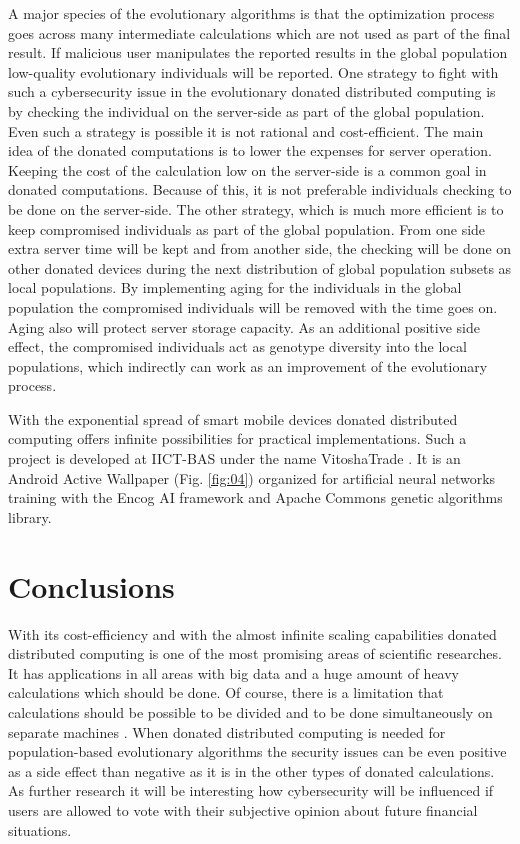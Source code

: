 \documentclass[graybox]{svmult}
\begin{document}
A major species of the evolutionary algorithms is that the optimization process goes across many intermediate calculations which are not used as part of the final result. If malicious user manipulates the reported results in the global population low-quality evolutionary individuals will be reported. One strategy to fight with such a cybersecurity issue in the evolutionary donated distributed computing is by checking the individual on the server-side as part of the global population. Even such a strategy is possible it is not rational and cost-efficient. The main idea of the donated computations is to lower the expenses for server operation. Keeping the cost of the calculation low on the server-side is a common goal in donated computations. Because of this, it is not preferable individuals checking to be done on the server-side. The other strategy, which is much more efficient is to keep compromised individuals as part of the global population. From one side extra server time will be kept and from another side, the checking will be done on other donated devices during the next distribution of global population subsets as local populations. By implementing aging for the individuals in the global population the compromised individuals will be removed with the time goes on. Aging also will protect server storage capacity. As an additional positive side effect, the compromised individuals act as genotype diversity into the local populations, which indirectly can work as an improvement of the evolutionary process. 

With the exponential spread of smart mobile devices donated distributed computing offers infinite possibilities for practical implementations. Such a project is developed at IICT-BAS under the name VitoshaTrade  \cite{vitosha-trade-01}. It is an Android Active Wallpaper (Fig. \ref{fig:04}) organized for artificial neural networks training with the Encog AI framework and Apache Commons genetic algorithms library. 

\section{Conclusions}
\label{sec:04}

With its cost-efficiency and with the almost infinite scaling capabilities donated distributed computing is one of the most promising areas of scientific researches. It has applications in all areas with big data and a huge amount of heavy calculations which should be done. Of course, there is a limitation that calculations should be possible to be divided and to be done simultaneously on separate machines \cite{distributed-computing-01}. When donated distributed computing is needed for population-based evolutionary algorithms the security issues can be even positive as a side effect than negative as it is in the other types of donated calculations. As further research it will be interesting how cybersecurity will be influenced if users are allowed to vote \cite{crowdsensing-01,voting-01} with their subjective opinion about future financial situations. 
\end{document}

